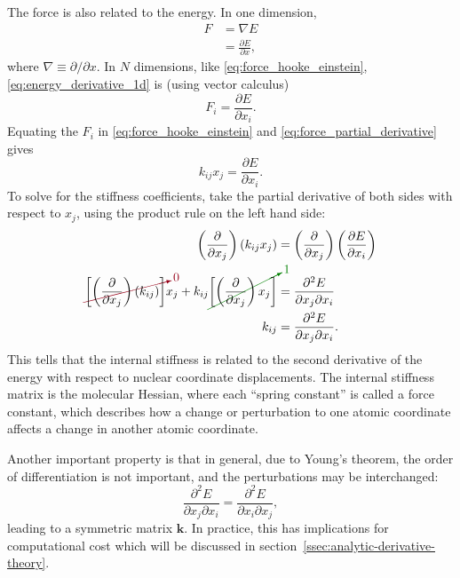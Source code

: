 \documentclass[%
class = book,%
crop = false,%
float = true,%
multi = true,%
preview = false,%
]{standalone}
\begin{document}
The force is also related to the energy. In one dimension,
\begin{align}
  \label{eq:energy_derivative_1d}
  F &= \nabla E \\
  &= \frac{\partial E}{\partial x},
\end{align}
where \(\nabla \equiv \partial/\partial x\). In \(N\) dimensions, like \eqref{eq:force_hooke_einstein}, \eqref{eq:energy_derivative_1d} is (using vector calculus)
\begin{equation}
  \label{eq:force_partial_derivative}
  F_{i} = \frac{\partial E}{\partial x_{i}}.
\end{equation}
Equating the \(F_{i}\) in \eqref{eq:force_hooke_einstein} and \eqref{eq:force_partial_derivative} gives
\begin{equation}
  \label{eq:equated_force}
  k_{ij} x_{j} = \frac{\partial E}{\partial x_{i}}.
\end{equation}
To solve for the stiffness coefficients, take the partial derivative of both sides with respect to \(x_{j}\), using the product rule on the left hand side:
\begin{align}
  \label{eq:hooke_derivation_1}
  \left( \frac{\partial}{\partial x_{j}} \right) \left( k_{ij} x_{j} \right) &= \left( \frac{\partial}{\partial x_{j}} \right) \left( \frac{\partial E}{\partial x_{i}} \right) \\
  \label{eq:hooke_derivation_2}
  \Ccancelto[carmine]{0}{\left[ \left( \frac{\partial}{\partial x_{j}} \right) \left( k_{ij} \right) \right]} x_{j} + k_{ij} \Ccancelto[Green]{1}{\left[ \left( \frac{\partial}{\partial x_{j}} \right) x_{j} \right]} &= \frac{\partial^{2} E}{\partial x_{j} \partial x_{i}} \\
  \label{eq:hooke_derivation_3}
  k_{ij} &= \frac{\partial^{2} E}{\partial x_{j} \partial x_{i}}.
\end{align}
This tells that the internal stiffness is related to the second derivative of the energy with respect to nuclear coordinate displacements. The internal stiffness matrix is the molecular Hessian, where each ``spring constant'' is called a force constant, which describes how a change or perturbation to one atomic coordinate affects a change in another atomic coordinate.

Another important property is that in general, due to Young's theorem, the order of differentiation is not important, and the perturbations may be interchanged:
\begin{equation}
  \label{eq:youngs-theorem}
  \frac{\partial^{2} E}{\partial x_{j} \partial x_{i}} = \frac{\partial^{2} E}{\partial x_{i} \partial x_{j}},
\end{equation}
leading to a symmetric matrix \(\mathbf{k}\). In practice, this has implications for computational cost which will be discussed in section~\ref{ssec:analytic-derivative-theory}.
\end{document}
